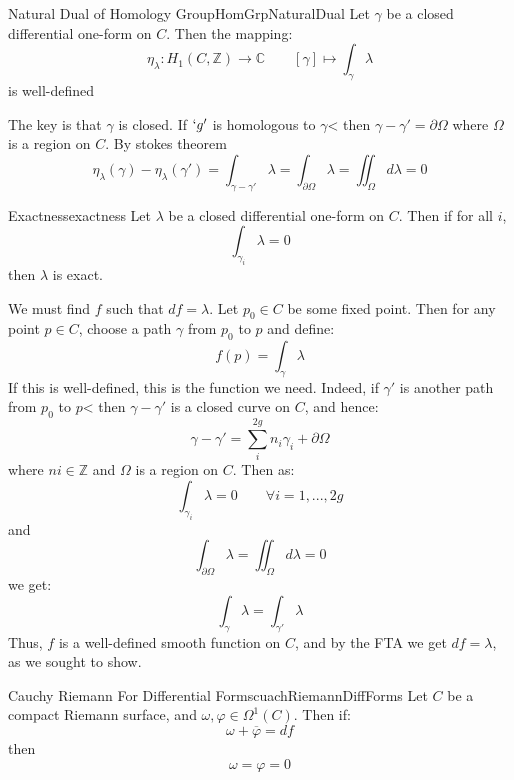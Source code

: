 \documentclass{book}
\newcommand{\C}{{\mathbb{C}}}
\newcommand{\Z}{{\mathbb{Z}}}
\let\temp\phi
\let\phi\varphi
\let\varphi\temp
\begin{document}
\begin{prop}{Natural Dual of Homology Group}{HomGrpNaturalDual}
  Let $\gamma$ be a closed differential one-form on $C$. Then the mapping:
  \[
    \eta_\lambda: H_1(C, \Z) \to \C \qquad [\gamma] \mapsto \int_\gamma \lambda
  \]
  is well-defined
\end{prop}

\begin{Proof}
  The key is that $\gamma$ is closed. If $`g'$ is homologous to $\gamma$< then $\gamma-\gamma' = \partial
  \Omega$ where $\Omega$ is a region on $C$. By stokes theorem
  \[
    \eta_\lambda(\gamma) - \eta_\lambda(\gamma') = \int_{\gamma-\gamma'} \lambda = \int_{\partial\Omega}
    \lambda = \iint_{\Omega} d\lambda = 0
  \]
\end{Proof}

\begin{prop}{Exactness}{exactness}
  Let $\lambda$ be a closed differential one-form on $C$. Then if for all $i$,
  \[
    \int_{\gamma_i}\lambda = 0
  \]
  then $\lambda$ is exact.
\end{prop}

\begin{Proof}
  We must find $f$ such that $d f = \lambda$. Let $p_0 \in C$ be some fixed point. Then for any point $p \in
  C$, choose a path $\gamma$ from $p_0$ to $p$ and define:
  \[
    f(p)  = \int_\gamma \lambda
  \]
  If this is well-defined, this is the function we need. Indeed, if $\gamma'$ is another path from $p_0$ to
  $p$< then $\gamma -  \gamma'$ is a closed curve on $C$, and hence:
  \[
    \gamma - \gamma' = \sum_i^{2g}n_i\gamma_i + \partial \Omega
  \]
  where $ni \in \Z$ and $\Omega$ is a region on $C$. Then as:
  \[
    \int_{\gamma_i} \lambda  =0 \qquad \forall i = 1, ..., 2g
  \]
  and
  \[
    \int_{\partial \Omega} \lambda = \iint_\Omega d\lambda = 0
  \]
  we get:
  \[
    \int_\gamma \lambda = \int_{\gamma'} \lambda
  \]
  Thus, $f$ is a well-defined smooth function on $C$, and by the FTA we get $d f  = \lambda$,  as we sought to
  show.
\end{Proof}

\begin{prop}{Cauchy Riemann For Differential Forms}{cuachRiemannDiffForms}
  Let $C$ be a compact Riemann surface, and $\omega, \phi \in \Omega^{1}(C)$. Then if:
  \[
    \omega + \overline{\phi} = d f
  \]
  then
  \[
    \omega = \phi = 0
  \]
\end{prop}
\end{document}
